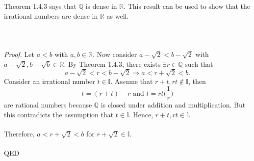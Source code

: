 \documentclass{article}
\begin{document}
        Theorem 1.4.3 says that $\mathbb{Q}$ is dense in $\mathbb{R}$. This result can be used to show that the irrational numbers are dense in $\mathbb{R}$ as well.
        \\ \\
        \\ \\
        \textit{Proof.} Let $a<b$ with $a,b \in \mathbb{R}$. Now consider $a - \sqrt{2} < b - \sqrt{2}$ with $a-\sqrt{2},b-\sqrt{b}\in \mathbb{R}$. By Theorem 1.4.3, there exists $\exists r \in \mathbb{Q}$ such that
        \begin{equation*}
            a-\sqrt{2} < r < b-\sqrt{2} \Rightarrow a < r + \sqrt{2} < b.
        \end{equation*}
        Consider an irrational number $t \in \mathbb{I}$. Assume that $r+t, rt \notin \mathbb{I}$, then
        \begin{equation*}
            t = (r+t)-r \text{ and } t = rt\bigg(\frac{1}{r}\bigg)
        \end{equation*}
        are rational numbers because $\mathbb{Q}$ is closed under addition and multiplication. But this contradicts the assumption that $t \in \mathbb{I}$. Hence, $r+t,rt \in \mathbb{I}$.\\ \\
        Therefore, $a<r+\sqrt{2}<b$ for $r + \sqrt{2} \in \mathbb{I}$.\\ \\
        QED
    
\end{document}
